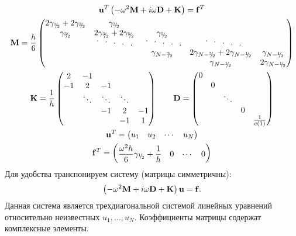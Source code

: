 \documentclass[12pt]{article}
\newcommand{\cutefrac}[2]{{}^{#1\!}\!/{\!}_#2}
\newcommand{\half}{\cutefrac{1}{2}}
\newcommand{\cuteddots}{
\text{
\raisebox{.6ex}{$\cdot$}\hspace{.75em}%
\raisebox{.3ex}{$\cdot$}\hspace{.75em}%
$\cdot$\hspace{.75em}%
\raisebox{-.3ex}{$\cdot$}\hspace{.75em}%
\raisebox{-.6ex}{$\cdot$}%
}}
\begin{document}
\begin{gather*}
\mathbf{u}^T \left(-\omega^2 \mathbf{M} + i\omega \mathbf{D} + \mathbf{K}\right) =
\mathbf{f}^T\\
\mathbf{M} = 
\frac{h}{6}
\begin{pmatrix}
2\gamma_{\half} + 2\gamma_{\cutefrac{3}{2}} & \gamma_{\cutefrac{3}{2}}\\
\gamma_{\cutefrac{3}{2}} & 2\gamma_{\cutefrac{3}{2}} + 2\gamma_{\cutefrac{5}{2}} & \gamma_{\cutefrac{5}{2}}\\
& \cuteddots\; & \cuteddots & \;\cuteddots \\
& & \gamma_{N - \cutefrac{3}{2}} & 2\gamma_{N - \cutefrac{3}{2}} + 2\gamma_{N
- \half} & \gamma_{N-\half}\\
& & & \gamma_{N - \half} & 2\gamma_{N-\half}
\end{pmatrix}
\\
\mathbf{K} = 
\frac{1}{h}
\begin{pmatrix}
2 & -1\\
-1 & 2 & -1\\
& \ddots & \ddots & \ddots \\
& & -1 & 2 & -1\\
& & & -1 & 1
\end{pmatrix}\qquad
\mathbf{D} = 
\begin{pmatrix}
0  \\
& 0 \\
& & \ddots \\
& & & 0 \\
& & & & \frac{1}{c(1)}
\end{pmatrix}\\
\mathbf{u}^T = \begin{pmatrix} u_1 & u_2 & \cdots & u_N \end{pmatrix}\\
\mathbf{f}^T = \begin{pmatrix} \dfrac{\omega^2 h}{6}\gamma_{\half} + \dfrac{1}{h} & 0 & \cdots & 0 \end{pmatrix}
\end{gather*}
Для удобства транспонируем систему (матрицы симметричны):
\[
\left(-\omega^2 \mathbf{M} + i\omega \mathbf{D} + \mathbf{K}\right)\mathbf{u} =
\mathbf{f}.\\
\]
Данная система является трехдиагональной системой линейных уравнений
относительно неизвестных $u_1, \dots, u_N$. Коэффициенты матрицы содержат
комплексные элементы.
\end{document}
